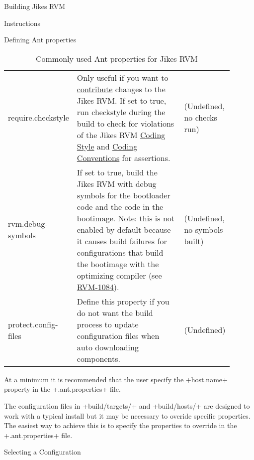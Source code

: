 \begin{section}{Building Jikes RVM}
\begin{subsection}{Instructions}
\begin{subsubsection}{Defining Ant properties}
\begin{table}
\begin{tabular}{p{0.15\linewidth}p{0.6\linewidth}p{0.15\linewidth}}
require.\newline checkstyle & Only useful if you want to \href{http://www.jikesrvm.org/Contributions/}{contribute} changes to the Jikes RVM. If set to true, run checkstyle during the build to check for violations of the Jikes RVM \hyperref[sec:codingstyle]{Coding Style} and \hyperref[sec:codingconventions]{Coding Conventions} for assertions. & (Undefined, no checks run) \\
rvm.debug-symbols & If set to true, build the Jikes RVM with debug symbols for the bootloader code and the code in the bootimage. Note: this is not enabled by default because it causes build failures for configurations that build the bootimage with the optimizing compiler (see \href{https://xtenlang.atlassian.net/browse/RVM-1084}{RVM-1084}). & (Undefined, no symbols built) \\
protect.config-files & Define this property if you do not want the build process to update configuration files when auto downloading components. & (Undefined) \\
\end{tabular}
\caption{Commonly used Ant properties for Jikes RVM}
\end{table}

At a minimum it is recommended that the user specify the \spverb+host.name+ property in the \spverb+.ant.properties+ file.

The configuration files in \spverb+build/targets/+ and \spverb+build/hosts/+ are designed to work with a typical install but it may be necessary to overide specific properties. The easiest way to achieve this is to specify the properties to override in the \spverb+.ant.properties+ file.

\end{subsubsection}

\begin{subsubsection}{Selecting a Configuration}


\end{subsubsection}
\end{subsection}
\end{section}
